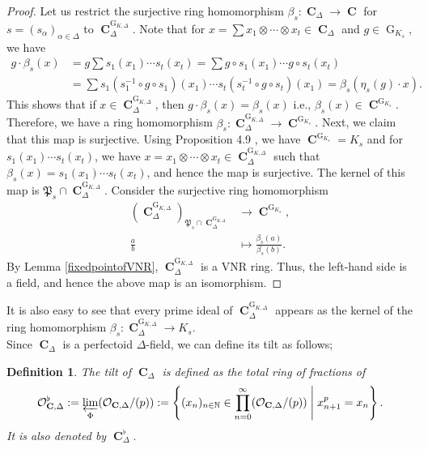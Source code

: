 \documentclass{amsart}
\newtheorem{definition}[proposition]{Definition}
\DeclareMathOperator{\C}{\textbf{C}}
\DeclareMathOperator{\G}{G}
\begin{document}
\begin{proof}
   Let us restrict the surjective ring homomorphism $\beta_s:\C_\Delta\to \C$ for $s=(s_\alpha)_{\alpha\in\Delta}$ to $\C^{\G_{K,\Delta}}_\Delta$. Note that for $x=\sum x_1\otimes\cdots\otimes x_t\in\C_\Delta$ and $g\in\G_{K_s}$, we have 
   \begin{align*}
       g\cdot \beta_s(x)&=g\sum s_1(x_1)\cdots s_t(x_t)
                        =\sum g\circ s_1(x_1)\cdots g\circ s_t(x_t)\\
                        &=\sum s_1(s^{-1}_1\circ g\circ s_1)(x_1)\cdots s_t(s^{-1}_t\circ g\circ s_t)(x_1)
                        =\beta_s(\eta_s(g)\cdot x).
   \end{align*}
   This shows that if $x\in \C^{\G_{K,\Delta}}_\Delta$, then $g\cdot\beta_s(x)=\beta_s(x)$ i.e., $\beta_s(x)\in \C^{\G_{K_s}}$. Therefore, we have a ring homomorphism $\beta_s:\C^{\G_{K,\Delta}}_\Delta\to \C^{\G_{K_s}}$. Next, we claim that this map is surjective. Using Proposition 4.9 \cite{Fontaine}, we have $\C^{\G_{K_s}}=K_s$ and for $s_1(x_1)\cdots s_t(x_t)$, we have $x= x_1\otimes\cdots\otimes x_t\in\C^{\G_{K,\Delta}}_\Delta$ such that $\beta_s(x)=s_1(x_1)\cdots s_t(x_t)$, and hence the map is surjective. The kernel of this map is $\mathfrak{P}_s\cap \C^{\G_{K,\Delta}}_\Delta$. Consider the surjective ring homomorphism
   \begin{align*}
       (\C^{\G_{K,\Delta}}_\Delta)_{\mathfrak{P}_s\cap \C^{\G_{K,\Delta}}_\Delta}&\to \C^{\G_{K_s}},\\
                    \frac{a}{b} &\mapsto \frac{\beta_s(a)}{\beta_s(b)}.
   \end{align*}
   By Lemma \ref{fixedpointofVNR}, $\C^{\G_{K,\Delta}}_\Delta$ is a VNR ring. Thus, the left-hand side is a field, and hence the above map is an isomorphism. 
\end{proof}

It is also easy to see that every prime ideal of $\C^{\G_{K,\Delta}}_\Delta$ appears as the kernel of the ring homomorphism $\beta_s:\C^{\G_{K,\Delta}}_\Delta\to K_s$. \\

Since $\C_\Delta$ is a perfectoid $\Delta$-field, we can define its tilt as follows;

\begin{definition}
    The \emph{tilt} of $\C_\Delta$ is defined as the total ring of fractions of
    \begin{align*}
        \mathcal{O}^\flat_{\C,\Delta}:=\varprojlim\limits_{\Phi}(\mathcal{O}_{\C,\Delta}/(p)):=\left\{(x_n)_{n\in\mathbb{N}}\in\prod\limits_{n=0}^\infty(\mathcal{O}_{\C,\Delta}/(p))\;\middle|\; x^p_{n+1}=x_n\right\}.
    \end{align*}
    It is also denoted by $\C^\flat_\Delta.$
\end{definition}
\end{document}
